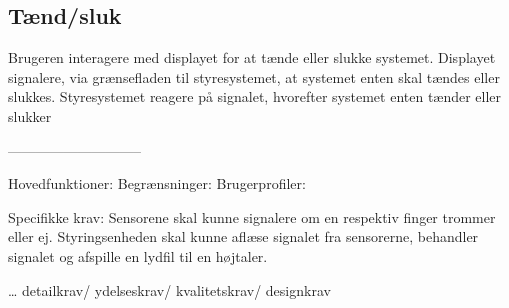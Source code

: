 \subsection{Tænd/sluk}
Brugeren interagere med displayet for at tænde eller slukke systemet. Displayet signalere, via grænsefladen til styresystemet, at systemet enten skal tændes eller slukkes. Styresystemet reagere på signalet, hvorefter systemet enten tænder eller slukker




-----------------------------

Hovedfunktioner: 
Begrænsninger:
Brugerprofiler:

Specifikke krav: 
Sensorene skal kunne signalere om en respektiv finger trommer eller ej. 
Styringsenheden skal kunne aflæse signalet fra sensorerne, behandler signalet og afspille en lydfil til en højtaler.

… detailkrav/
ydelseskrav/
kvalitetskrav/
designkrav      

 
